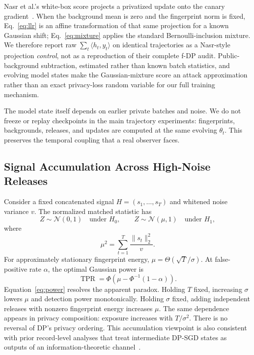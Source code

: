 \documentclass[conference]{IEEEtran}
\newcommand{\Normal}{\mathcal{N}}
\begin{document}
Nasr et al.'s white-box score projects a privatized update onto the canary gradient~\cite{nasr2023tight}. When the background mean is zero and the fingerprint norm is fixed, Eq.~\ref{eq:llr} is an affine transformation of that same projection for a known Gaussian shift; Eq.~\ref{eq:mixture} applies the standard Bernoulli-inclusion mixture. We therefore report raw $\sum_t\langle h_t,y_t\rangle$ on identical trajectories as a Nasr-style projection \emph{control}, not as a reproduction of their complete f-DP audit. Public-background subtraction, estimated rather than known batch statistics, and evolving model states make the Gaussian-mixture score an attack approximation rather than an exact privacy-loss random variable for our full training mechanism.

The model state itself depends on earlier private batches and noise. We do not freeze or replay checkpoints in the main trajectory experiments: fingerprints, backgrounds, releases, and updates are computed at the same evolving $\theta_t$. This preserves the temporal coupling that a real observer faces.

\subsection{Signal Accumulation Across High-Noise Releases}

Consider a fixed concatenated signal $H=(s_1,\ldots,s_T)$ and whitened noise variance $v$. The normalized matched statistic has
\begin{equation}
Z\sim\Normal(0,1)\quad\text{under }H_0,
\qquad
Z\sim\Normal(\mu,1)\quad\text{under }H_1,
\end{equation}
where
\begin{equation}
\mu^2=\sum_{t=1}^{T}\frac{\lVert s_t\rVert_2^2}{v}.
\label{eq:mu}
\end{equation}
For approximately stationary fingerprint energy, $\mu=\Theta(\sqrt{T}/\sigma)$. At false-positive rate $\alpha$, the optimal Gaussian power is
\begin{equation}
\operatorname{TPR}=\Phi\left(\mu-\Phi^{-1}(1-\alpha)\right).
\label{eq:power}
\end{equation}
Equation~\ref{eq:power} resolves the apparent paradox. Holding $T$ fixed, increasing $\sigma$ lowers $\mu$ and detection power monotonically. Holding $\sigma$ fixed, adding independent releases with nonzero fingerprint energy increases $\mu$. The same dependence appears in privacy composition: exposure increases with $T/\sigma^2$. There is no reversal of DP's privacy ordering. This accumulation viewpoint is also consistent with prior record-level analyses that treat intermediate DP-SGD states as outputs of an information-theoretic channel~\cite{cherubin2024closed}.
\end{document}
